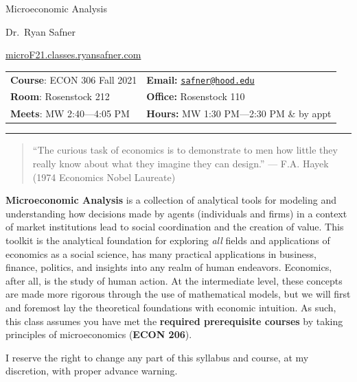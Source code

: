 \documentclass{article}
\begin{document}
\sffamily

\centerline{\Huge Microeconomic Analysis}

\vspace{3 mm}

\centerline{\large Dr.~Ryan Safner}
\vspace{2 mm}
\centerline{\large \href{http://microF21.classes.ryansafner.com}{microF21.classes.ryansafner.com}}

\vspace{5 mm}

\begin{tabular}{@{}p{3.5in}p{3.5in}}           
\textbf{Course}: ECON 306 Fall
2021  & \textbf{Email:}  \href{mailto:safner@hood.edu}{\nolinkurl{safner@hood.edu}}\\
\textbf{Room}: Rosenstock 212 & \textbf{Office:}  Rosenstock 110\\
\textbf{Meets}: MW 2:40---4:05 PM & \textbf{Hours:}  MW 1:30 PM---2:30
PM \& by appt\\ 
\end{tabular}

\vspace{5 mm}

\hrule


\begin{quote}
``The curious task of economics is to demonstrate to men how little they
really know about what they imagine they can design.'' {--- F.A. Hayek
(1974 Economics Nobel Laureate)}
\end{quote}

\textbf{Microeconomic Analysis} is a collection of analytical tools for
modeling and understanding how decisions made by agents (individuals and
firms) in a context of market institutions lead to social coordination
and the creation of value. This toolkit is the analytical foundation for
exploring \emph{all} fields and applications of economics as a social
science, has many practical applications in business, finance, politics,
and insights into any realm of human endeavors. Economics, after all, is
the study of human action. At the intermediate level, these concepts are
made more rigorous through the use of mathematical models, but we will
first and foremost lay the theoretical foundations with economic
intuition. As such, this class assumes you have met the \textbf{required
prerequisite courses} by taking principles of microeconomics
(\textbf{ECON 206}).

I reserve the right to change any part of this syllabus and course, at
my discretion, with proper advance warning.
\end{document}
